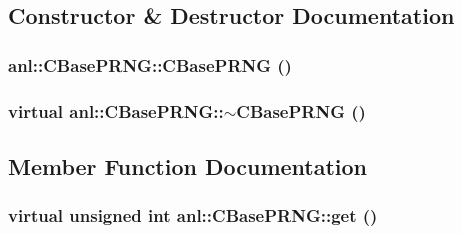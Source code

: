 \subsection{Constructor \& Destructor Documentation}
\hypertarget{classanl_1_1CBasePRNG_aa5af1d977bcddc28584a1e0133701c30}{
\subsubsection[{CBasePRNG}]{\setlength{\rightskip}{0pt plus 5cm}anl::CBasePRNG::CBasePRNG ()}}
\label{classanl_1_1CBasePRNG_aa5af1d977bcddc28584a1e0133701c30}
\hypertarget{classanl_1_1CBasePRNG_a05752d435025c6cbb29cb5c5e50d2257}{
\subsubsection[{$\sim$CBasePRNG}]{\setlength{\rightskip}{0pt plus 5cm}virtual anl::CBasePRNG::$\sim$CBasePRNG ()}}
\label{classanl_1_1CBasePRNG_a05752d435025c6cbb29cb5c5e50d2257}


\subsection{Member Function Documentation}
\hypertarget{classanl_1_1CBasePRNG_a7a0fcd0d3c4b0f9f160835b4b254a1ed}{
\subsubsection[{get}]{\setlength{\rightskip}{0pt plus 5cm}virtual unsigned int anl::CBasePRNG::get ()}}
\label{classanl_1_1CBasePRNG_a7a0fcd0d3c4b0f9f160835b4b254a1ed}


